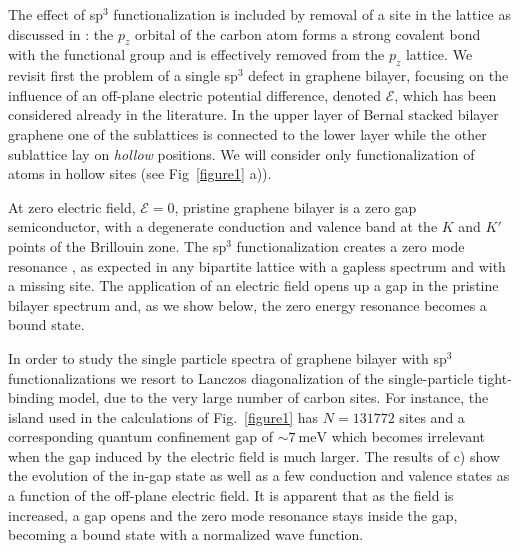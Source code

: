 The effect of sp$^3$ functionalization is included by removal of a site in the lattice as discussed in : the $p_z$ orbital of the carbon atom forms a strong covalent bond with the functional group and is effectively removed from the $p_z$ lattice\cite{}. We revisit first the problem of a single sp$^3$ defect in graphene bilayer\cite{Castro2010}, focusing on the influence of an off-plane electric potential difference, denoted $\mathcal{E}$, which has been considered already in the literature\cite{Nilsson2007}.
In the upper layer of Bernal stacked bilayer graphene one of the sublattices is connected to the lower layer while the other sublattice lay on \emph{hollow} positions. We will consider only functionalization of atoms in hollow sites (see Fig~\ref{figure1} a)). 

At zero electric field, $\mathcal{E}=0$, pristine graphene bilayer is a zero gap semiconductor, with a degenerate conduction and valence band at the $K$ and $K'$ points of the Brillouin zone\cite{McCann2012}. The sp$^3$ functionalization creates a zero mode resonance \cite{Nilsson2007,Castro2010}, as expected in any bipartite lattice with a gapless spectrum and with a missing site.\cite{Lieb1989} %
The application of an electric field opens up a gap in the pristine bilayer spectrum and, as we show below, the zero energy resonance becomes a bound state.

In order to study the single particle spectra of graphene bilayer with sp$^3$ functionalizations we resort to Lanczos diagonalization\cite{Lanczos1950, Arnoldi1951} of the single-particle tight-binding model, due to the very large number of carbon sites. For instance, the island used in the calculations of Fig.~\ref{figure1} has $N=131772$ sites and a corresponding quantum confinement gap of $\sim\SI{7}{\meV}$ which becomes irrelevant when the gap induced by the electric field is much larger. 
The results of c) show the evolution of the in-gap state as well as a few conduction and valence states as a function of the off-plane electric field. It is apparent that as the field is increased, a gap opens and the zero mode resonance stays inside the gap, becoming a bound state with a normalized wave function.


